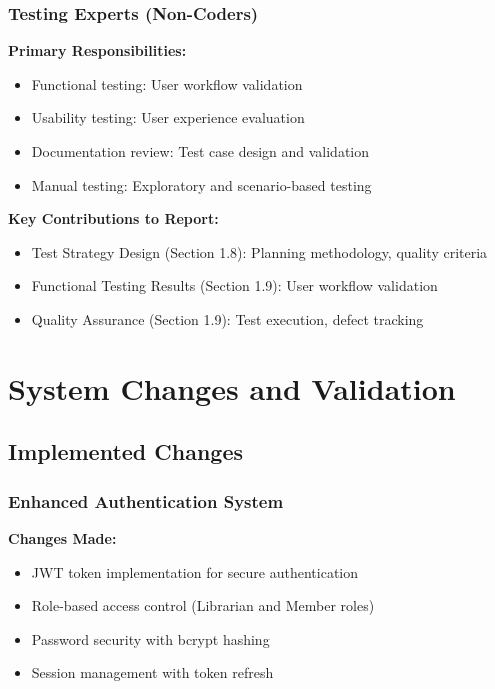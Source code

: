 \documentclass[12pt,a4paper]{article}
\begin{document}
\subsubsection{Testing Experts (Non-Coders)}
\textbf{Primary Responsibilities:}
\begin{itemize}[leftmargin=*]
    \item Functional testing: User workflow validation
    \item Usability testing: User experience evaluation
    \item Documentation review: Test case design and validation
    \item Manual testing: Exploratory and scenario-based testing
\end{itemize}

\textbf{Key Contributions to Report:}
\begin{itemize}[leftmargin=*]
    \item Test Strategy Design (Section 1.8): Planning methodology, quality criteria
    \item Functional Testing Results (Section 1.9): User workflow validation
    \item Quality Assurance (Section 1.9): Test execution, defect tracking
\end{itemize}

\section{System Changes and Validation}

\subsection{Implemented Changes}

\subsubsection{Enhanced Authentication System}
\textbf{Changes Made:}
\begin{itemize}[leftmargin=*]
    \item JWT token implementation for secure authentication
    \item Role-based access control (Librarian and Member roles)
    \item Password security with bcrypt hashing
    \item Session management with token refresh
\end{itemize}
\end{document}
